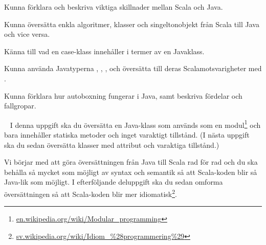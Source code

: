 

\ifPreSolution



\Exercise{\ExeWeekELEVEN}\label{exe:W11}

\begin{Goals}
\item Kunna förklara och beskriva viktiga skillnader mellan Scala och Java.
\item Kunna översätta enkla algoritmer, klasser och singeltonobjekt från Scala till Java och vice versa.
\item Känna till vad en case-klass innehåller i termer av en Javaklass.
\item Kunna använda Javatyperna , , ,  och översätta till deras Scalamotsvarigheter med .
\item Kunna förklara hur autoboxning fungerar i Java, samt beskriva fördelar och fallgropar.
\end{Goals}

\begin{Preparations}
\item {}
\end{Preparations}

\BasicTasks %

\else



\ExerciseSolution{\ExeWeekELEVEN}

\BasicTasks %

\fi






\QUESTBEGIN

\Task  \what~  I denna uppgift ska du översätta en Java-klass som används som en modul\footnote{\href{https://en.wikipedia.org/wiki/Modular_programming}{en.wikipedia.org/wiki/Modular\_programming}} och bara innehåller statiska metoder och inget varaktigt tillstånd. (I nästa uppgift ska du sedan översätta klasser med attribut och varaktiga tillstånd.)

Vi börjar med att göra översättningen från Java till Scala rad för rad och du ska behålla så mycket som möjligt av syntax och semantik så att Scala-koden blir så Java-lik som möjligt. I efterföljande deluppgift ska du sedan omforma översättningen så att Scala-koden blir mer idiomatisk\footnote{\href{https://sv.wikipedia.org/wiki/Idiom_\%28programmering\%29}{sv.wikipedia.org/wiki/Idiom\_\%28programmering\%29}}.

